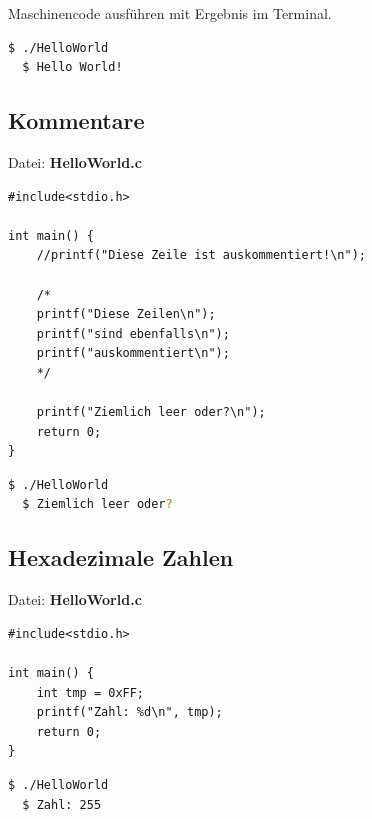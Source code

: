 \documentclass[11pt,a4paper,ngerman, fleqn]{article}
\let\noi\noindent
\let\tbf\textbf
\begin{document}
\noi Maschinencode ausführen mit Ergebnis im Terminal.

\begin{lstlisting}[language=bash,  backgroundcolor=\color{pureblack}, basicstyle=\ttfamily\footnotesize\color{purewhite}, rulecolor=\color{slightgray}]
  $ ./HelloWorld
  $ Hello World!
\end{lstlisting}

\subsection{Kommentare}
\label{sec:12}


Datei: \tbf{HelloWorld.c}

\begin{lstlisting}
#include<stdio.h>

int main() {
	//printf("Diese Zeile ist auskommentiert!\n");
	
	/*
	printf("Diese Zeilen\n");
	printf("sind ebenfalls\n");
	printf("auskommentiert\n");
	*/
	
	printf("Ziemlich leer oder?\n");
	return 0;
}
\end{lstlisting}

\begin{lstlisting}[language=bash,  backgroundcolor=\color{pureblack}, basicstyle=\ttfamily\footnotesize\color{purewhite}, rulecolor=\color{slightgray}]
  $ ./HelloWorld
  $ Ziemlich leer oder?
\end{lstlisting}


\subsection{Hexadezimale Zahlen}
\label{sec:13}


Datei: \tbf{HelloWorld.c}

\begin{lstlisting}
#include<stdio.h>

int main() {
	int tmp = 0xFF;
	printf("Zahl: %d\n", tmp);
	return 0;
}
\end{lstlisting}

\begin{lstlisting}[language=bash,  backgroundcolor=\color{pureblack}, basicstyle=\ttfamily\footnotesize\color{purewhite}, rulecolor=\color{slightgray}]
  $ ./HelloWorld
  $ Zahl: 255
\end{lstlisting}
\end{document}
